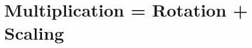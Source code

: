 \documentclass[10pt]{beamer}
\theoremstyle{definition}
\begin{document}
\section{Multiplication = Rotation + Scaling}
\end{document}
